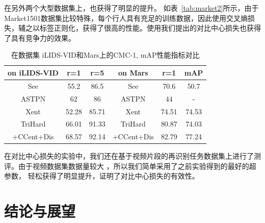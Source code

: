 在另外两个大型数据集上，也获得了明显的提升。
如表~\ref{tab:market2}所示，由于Market1501数据集比较特殊，每个行人具有充足的训练数据，因此使用交叉熵损失，辅之以标签正则化，获得了很高的性能。使用我们提出的对比中心损失也获得了具有竞争力的效果。

\begin{table}
	\centering
	\caption{在数据集 iLIDS-VID和Mars上的CMC-1, mAP性能指标对比}
	\label{tab:mars2}
	\begin{tabular}{c|cc||c|cc}
		\hline
		on  iLIDS-VID              & r=1   & r=5   & on Mars                              & r=1   & mAP   \\ \hline  
		See  \cite{zhou2017see}    & 55.2  & 86.5  & See                                  & 70.6  & 50.7  \\  
		ASTPN \cite{xu2017jointly} & 62    & 86    & ASTPN                                & 44    & -     \\ 
		Xent                       &  52.28  & 85.71   & Xent                                 &74.51& 74.53 \\
		TriHard                    & 66.01     & 91.33   & TriHard                              & 80.87 &	74.03  \\
		+CCent+Dis                 & 68.57 &  92.14  & +CCent+Dis                           &  82.79     &   77.24    \\  \hline 
	\end{tabular}
\end{table}

在对比中心损失的实验中，我们还在基于视频片段的再识别任务数据集上进行了测评。由于视频数据集数据量较大
，所以我们简单采用了之前实验得到的最好的超参数，
轻松获得了明显提升，证明了对比中心损失的有效性。

\chapter{结论与展望}

